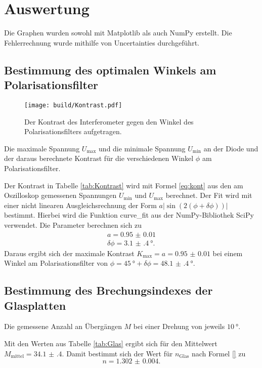 \section{Auswertung}
\label{sec:Auswertung}
Die Graphen wurden sowohl mit Matplotlib \cite{matplotlib} als auch NumPy \cite{numpy} erstellt. Die
Fehlerrechnung wurde mithilfe von Uncertainties \cite{uncertainties} durchgeführt.
\subsection{Bestimmung des optimalen Winkels am Polarisationsfilter}
\begin{figure}
	\centering
	\texttt{[image: build/Kontrast.pdf]}
	\caption{Der Kontrast des Interferometer gegen den Winkel des Polarisationsfilters aufgetragen.}
\end{figure}
\begin{table}
	\centering
	\caption{Die maximale Spannung $U_\text{max}$ und die minimale Spannung $U_\text{min}$ an der Diode und der daraus berechnete Kontrast für die verschiedenen Winkel $\phi$ am Polarisationsfilter.}
	
\end{table}
Der Kontrast in Tabelle \ref{tab:Kontrast} wird mit Formel \eqref{eq:kont} aus den am Oszilloskop gemessenen Spannungen $U_\text{min}$ und $U_\text{max}$ berechnet. Der Fit wird mit einer nicht linearen Ausgleichsrechnung der Form $a |\sin(2(\phi+\delta\phi))|$ bestimmt. Hierbei wird die Funktion curve\_fit aus der NumPy-Bibliothek SciPy \cite{scipy} verwendet. Die Parameter berechnen sich zu
\begin{gather*}
a=\num{0.95(1)}\\
\delta\phi=\SI{3.1(4)}{\degree}.
\end{gather*}
Daraus ergibt sich der maximale Kontrast $K_\text{max}=a=\num{0.95(1)}$ bei einem Winkel am Polarisationsfilter von $\phi=\SI{45}{\degree}+\delta\phi=\SI{48.1(4)}{\degree}$.

\subsection{Bestimmung des Brechungsindexes der Glasplatten}
\begin{table}
	\centering
	\caption{Die gemessene Anzahl an Übergängen $M$ bei einer Drehung von jeweils $\SI{10}{\degree}$.}
	
\end{table}
Mit den Werten aus Tabelle \ref{tab:Glas} ergibt sich für den Mittelwert $M_\text{mittel}=\num{34.1(4)}$. Damit bestimmt sich der Wert für $n_\text{Glas}$ nach Formel \eqref{} zu
\begin{displaymath}
	n=\num{1.302(4)}.
\end{displaymath}

